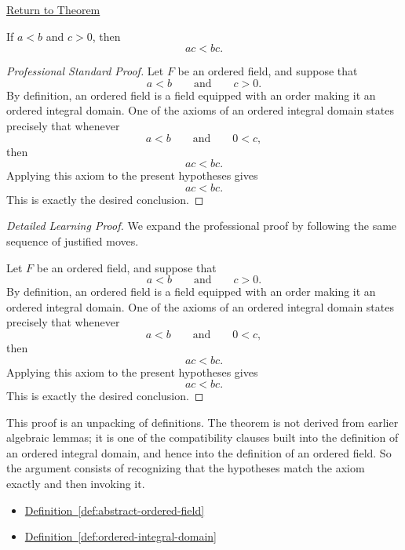 \newpage
{}
\label{prf:multiply-positive}

\begin{remark*}[Return]
\hyperref[thm:multiply-positive]{Return to Theorem}
\end{remark*}

\begin{theorem*}
If $a<b$ and $c>0$, then
\[
ac<bc.
\]
\end{theorem*}

\begin{proof}[Professional Standard Proof]
\LRAProofBodyStart
Let $F$ be an ordered field, and suppose that
\[
a<b
\qquad\text{and}\qquad
c>0.
\]
By definition, an ordered field is a field equipped with an order making it
an ordered integral domain.  One of the axioms of an ordered integral domain
states precisely that whenever
\[
a<b
\qquad\text{and}\qquad
0<c,
\]
then
\[
ac<bc.
\]
Applying this axiom to the present hypotheses gives
\[
ac<bc.
\]
This is exactly the desired conclusion.
\end{proof}

\begin{proof}[Detailed Learning Proof]
\LRAProofBodyStart
We expand the professional proof by following the same sequence of justified moves.

Let $F$ be an ordered field, and suppose that
\[
a<b
\qquad\text{and}\qquad
c>0.
\]
By definition, an ordered field is a field equipped with an order making it
an ordered integral domain.  One of the axioms of an ordered integral domain
states precisely that whenever
\[
a<b
\qquad\text{and}\qquad
0<c,
\]
then
\[
ac<bc.
\]
Applying this axiom to the present hypotheses gives
\[
ac<bc.
\]
This is exactly the desired conclusion.
\end{proof}

\begin{remark*}
This proof is an unpacking of definitions.  The theorem is not derived from
earlier algebraic lemmas; it is one of the compatibility clauses built into
the definition of an ordered integral domain, and hence into the definition
of an ordered field.  So the argument consists of recognizing that the
hypotheses match the axiom exactly and then invoking it.
\end{remark*}

\begin{dependencies}
\begin{itemize}
  \item \hyperref[def:abstract-ordered-field]{Definition~\ref*{def:abstract-ordered-field}}
  \item \hyperref[def:ordered-integral-domain]{Definition~\ref*{def:ordered-integral-domain}}
\end{itemize}
\end{dependencies}

\clearpage
